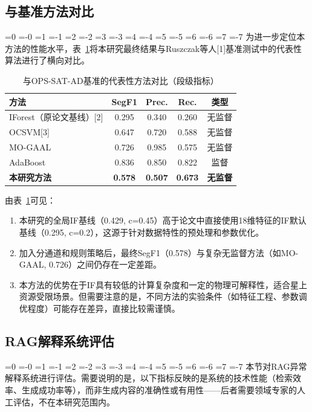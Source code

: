 \documentclass[12pt, a4paper]{article}
\newcommand{\zihao}[1]{%
    \ifnum#1=0 {\fontsize{42pt}{50pt}\selectfont}%
    \else\ifnum#1=-0 {\fontsize{36pt}{44pt}\selectfont}%
    \else\ifnum#1=1 {\fontsize{26pt}{32pt}\selectfont}%
    \else\ifnum#1=-1 {\fontsize{24pt}{28pt}\selectfont}%
    \else\ifnum#1=2 {\fontsize{22pt}{26pt}\selectfont}%
    \else\ifnum#1=-2 {\fontsize{18pt}{22pt}\selectfont}%
    \else\ifnum#1=3 {\fontsize{16pt}{20pt}\selectfont}%
    \else\ifnum#1=-3 {\fontsize{15pt}{18pt}\selectfont}%
    \else\ifnum#1=4 {\fontsize{14pt}{17pt}\selectfont}%
    \else\ifnum#1=-4 {\fontsize{12pt}{15pt}\selectfont}%
    \else\ifnum#1=5 {\fontsize{10.5pt}{13pt}\selectfont}%
    \else\ifnum#1=-5 {\fontsize{9pt}{11pt}\selectfont}%
    \else\ifnum#1=6 {\fontsize{7.5pt}{9pt}\selectfont}%
    \else\ifnum#1=-6 {\fontsize{6.5pt}{8pt}\selectfont}%
    \else\ifnum#1=7 {\fontsize{5.5pt}{7pt}\selectfont}%
    \else\ifnum#1=-7 {\fontsize{5pt}{6pt}\selectfont}%
    \fi\fi\fi\fi\fi\fi\fi\fi\fi\fi\fi\fi\fi\fi\fi\fi
}
\newcommand{\songti}{\CJKfontspec{SimSun}}
\begin{document}
\subsection{与基准方法对比}

\zihao{5}\songti
为进一步定位本方法的性能水平，表~\ref{tab:comparison}将本研究最终结果与Ruszczak等人[1]基准测试中的代表性算法进行了横向对比。

\begin{table}[H]
\centering
\caption{与OPS-SAT-AD基准的代表性方法对比（段级指标）}
\label{tab:comparison}
\begin{tabular}{lcccc}
\toprule
方法 & SegF1 & Prec. & Rec. & 类型 \\
\midrule
IForest（原论文基线）[2] & 0.295 & 0.340 & 0.260 & 无监督 \\
OCSVM[3] & 0.647 & 0.720 & 0.588 & 无监督 \\
MO-GAAL & 0.726 & 0.985 & 0.575 & 无监督 \\
AdaBoost & 0.836 & 0.850 & 0.822 & 监督 \\
\textbf{本研究方法} & \textbf{0.578} & \textbf{0.507} & \textbf{0.673} & \textbf{无监督} \\
\bottomrule
\end{tabular}
\end{table}

由表~\ref{tab:comparison}可见：

\begin{enumerate}[label=(\arabic*)]
    \item 本研究的全局IF基线（0.429, c=0.45）高于论文中直接使用18维特征的IF默认基线（0.295, c=0.2），这源于针对数据特性的预处理和参数优化。
    \item 加入分通道和规则策略后，最终SegF1（0.578）与复杂无监督方法（如MO-GAAL, 0.726）之间仍存在一定差距。
    \item 本方法的优势在于IF具有较低的计算复杂度和一定的物理可解释性，适合星上资源受限场景。但需要注意的是，不同方法的实验条件（如特征工程、参数调优程度）可能存在差异，直接比较需谨慎。
\end{enumerate}

\subsection{RAG解释系统评估}

\zihao{5}\songti
本节对RAG异常解释系统进行评估。需要说明的是，以下指标反映的是系统的技术性能（检索效率、生成成功率等），而非生成内容的准确性或有用性——后者需要领域专家的人工评估，不在本研究范围内。
\end{document}
